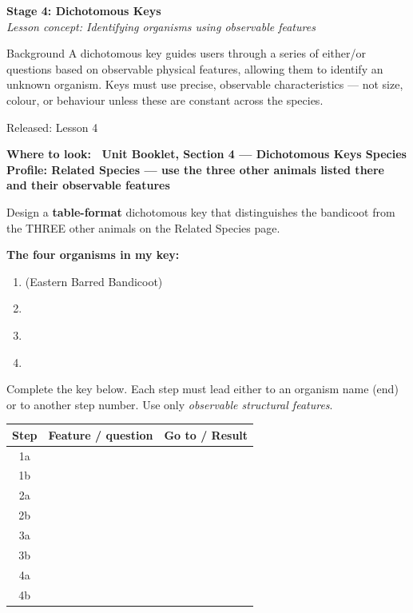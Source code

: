 \documentclass[11pt,a4paper]{article}
\newcommand{\wheretolook}[1]{%
  \par\vspace{2pt}\noindent
  \colorbox{GoldLight}{\parbox{\dimexpr\linewidth-2\fboxsep\relax}{%
    \small\color{GoldDark}\headingfont\bfseries Where to look:\ %
    \normalfont\color{DarkGrey}#1}}\par\vspace{4pt}}
\newcommand{\stagediv}[3]{%
  \needspace{6\baselineskip}
  \begin{tcolorbox}[
    enhanced, breakable=false, arc=3.5mm,
    colback=ForestDark, colframe=ForestDark, boxrule=0pt,
    sidebyside, sidebyside align=center,
    lefthand width=2.2cm,
    left=2mm, right=4mm, top=4mm, bottom=4mm
  ]
    \begin{center}
      {\headingfont\bfseries\color{Forest!35!ForestDark}\fontsize{42}{42}\selectfont #1}
    \end{center}
    \tcblower
    {\headingfont\bfseries\color{white}\large Stage #1: #2}\\[3pt]
    {\itshape\color{white!75!ForestDark}\small Lesson concept: #3}
  \end{tcolorbox}%
  \vspace{6pt}%
}
\newcommand{\yr}[2]{\noindent{\headingfont\bfseries\small\color{Forest}%
  \rule[0.2ex]{1.2em}{2pt}\hspace{4pt}#1}\hfill{\small\color{DarkGrey}#2}\\[2pt]}
\begin{document}
\newpage

\stagediv{4}{Dichotomous Keys}{Identifying organisms using observable features}

\begin{contextbox}{Background}
A dichotomous key guides users through a series of either/or questions based on observable physical features, allowing them to identify an unknown organism. Keys must use precise, observable characteristics --- not size, colour, or behaviour unless these are constant across the species.
\end{contextbox}

\bigskip

\begin{yr7box}
\yr{At The Level}{Released: Lesson 4}

\wheretolook{Unit Booklet, Section 4 --- Dichotomous Keys \textbullet{} \textbf{Species Profile: Related Species} --- use the three other animals listed there and their observable features}
Design a \textbf{table-format} dichotomous key that distinguishes the bandicoot from the THREE other animals on the Related Species page.

\smallskip
\noindent\textbf{The four organisms in my key:}
\begin{enumerate}[label=\arabic*., itemsep=2pt, topsep=4pt]
  \item \underline{\hspace{9cm}} (Eastern Barred Bandicoot)
  \item \underline{\hspace{9cm}}
  \item \underline{\hspace{9cm}}
  \item \underline{\hspace{9cm}}
\end{enumerate}

\medskip
\noindent Complete the key below. Each step must lead either to an organism name (end) or to another step number. Use only \emph{observable structural features}.

\medskip
\noindent\begin{tabularx}{\linewidth}{|c|X|c|}
  \hline
  \rowcolor{TableHead}
  \headingfont\bfseries\color{white} Step &
  \headingfont\bfseries\color{white} Feature / question &
  \headingfont\bfseries\color{white} Go to / Result \\
  \hline
  1a & & \\[18pt]
  \hline
  \rowcolor{RowAlt}
  1b & & \\[18pt]
  \hline
  2a & & \\[18pt]
  \hline
  \rowcolor{RowAlt}
  2b & & \\[18pt]
  \hline
  3a & & \\[18pt]
  \hline
  \rowcolor{RowAlt}
  3b & & \\[18pt]
  \hline
  4a & & \\[18pt]
  \hline
  \rowcolor{RowAlt}
  4b & & \\[18pt]
  \hline
\end{tabularx}


\end{yr7box}
\end{document}
